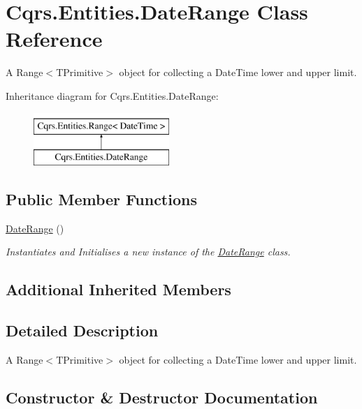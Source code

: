 \hypertarget{classCqrs_1_1Entities_1_1DateRange}{}\section{Cqrs.\+Entities.\+Date\+Range Class Reference}
\label{classCqrs_1_1Entities_1_1DateRange}


A Range$<$\+T\+Primitive$>$ object for collecting a Date\+Time lower and upper limit.  


Inheritance diagram for Cqrs.\+Entities.\+Date\+Range\+:\begin{figure}[H]
\begin{center}
\leavevmode
\includegraphics[height=2.000000cm]{classCqrs_1_1Entities_1_1DateRange}
\end{center}
\end{figure}
\subsection*{Public Member Functions}
\begin{DoxyCompactItemize}
\item 
\hyperlink{classCqrs_1_1Entities_1_1DateRange_adc6535de6e11720964fd355281444721}{Date\+Range} ()
\begin{DoxyCompactList}\small\item\em Instantiates and Initialises a new instance of the \hyperlink{classCqrs_1_1Entities_1_1DateRange}{Date\+Range} class. \end{DoxyCompactList}\end{DoxyCompactItemize}
\subsection*{Additional Inherited Members}


\subsection{Detailed Description}
A Range$<$\+T\+Primitive$>$ object for collecting a Date\+Time lower and upper limit. 



\subsection{Constructor \& Destructor Documentation}
\mbox{\label{classCqrs_1_1Entities_1_1DateRange_adc6535de6e11720964fd355281444721}} 
